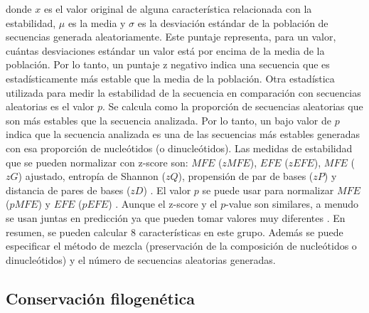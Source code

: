 \noindent donde $x$ es el valor original de alguna característica relacionada con la estabilidad, $\mu$ es la media y $\sigma$ es la desviación estándar de la
población de secuencias generada aleatoriamente. Este puntaje representa, para un valor, cuántas desviaciones estándar un valor está por encima de la media de
la población. Por lo tanto, un puntaje z negativo indica una secuencia que es estadísticamente más estable que la media de la población. Otra estadística
utilizada para medir la estabilidad de la secuencia en comparación con secuencias aleatorias es el valor $p$. Se calcula como la proporción de secuencias
aleatorias que son más estables que la secuencia analizada. Por lo tanto, un bajo valor de $p$ indica que la secuencia analizada es una de las secuencias más
estables generadas con esa proporción de nucleótidos (o dinucleótidos). Las medidas de estabilidad que se pueden normalizar con z-score son: $ MFE $ ($ zMFE $),
$ EFE $ ($ zEFE $), $ MFE $ ($ zG $) ajustado, entropía de Shannon ($ zQ $), propensión de par de bases ($ zP $) \citep{ng2007novo} y distancia de pares de
bases ($ zD $) \citep{ding2010mirensvm}. El valor $p$ se puede usar para normalizar $ MFE $ ($ pMFE $) \citep{bonnet2004evidence} y $ EFE $ ($ pEFE $)
\citep{ding2010mirensvm}. Aunque el z-score y el $p$-value son similares, a menudo se usan juntas en predicción ya que pueden tomar valores muy diferentes
\citep{ding2010mirensvm}. En resumen, se pueden calcular 8 características en este grupo. Además se puede especificar el método de mezcla (preservación de la
composición de nucleótidos o dinucleótidos) y el número de secuencias aleatorias generadas.

\subsection{Conservación filogenética}

